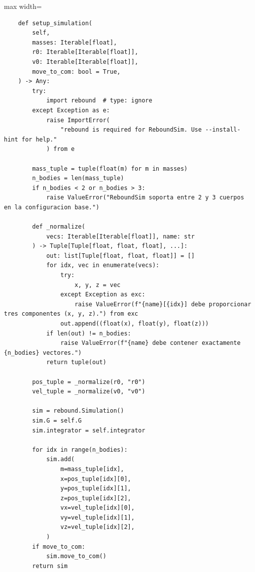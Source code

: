\begin{listing}[H]
\caption{Bloque de código de \texttt{setup\_simulation}}
\begin{minipage}{\linewidth}
{
\begin{adjustbox}{max width=\textwidth}
\begin{minipage}{\textwidth}
\begin{verbatim}
    def setup_simulation(
        self,
        masses: Iterable[float],
        r0: Iterable[Iterable[float]],
        v0: Iterable[Iterable[float]],
        move_to_com: bool = True,
    ) -> Any:
        try:
            import rebound  # type: ignore
        except Exception as e:
            raise ImportError(
                "rebound is required for ReboundSim. Use --install-hint for help."
            ) from e

        mass_tuple = tuple(float(m) for m in masses)
        n_bodies = len(mass_tuple)
        if n_bodies < 2 or n_bodies > 3:
            raise ValueError("ReboundSim soporta entre 2 y 3 cuerpos en la configuracion base.")

        def _normalize(
            vecs: Iterable[Iterable[float]], name: str
        ) -> Tuple[Tuple[float, float, float], ...]:
            out: list[Tuple[float, float, float]] = []
            for idx, vec in enumerate(vecs):
                try:
                    x, y, z = vec
                except Exception as exc:
                    raise ValueError(f"{name}[{idx}] debe proporcionar tres componentes (x, y, z).") from exc
                out.append((float(x), float(y), float(z)))
            if len(out) != n_bodies:
                raise ValueError(f"{name} debe contener exactamente {n_bodies} vectores.")
            return tuple(out)

        pos_tuple = _normalize(r0, "r0")
        vel_tuple = _normalize(v0, "v0")

        sim = rebound.Simulation()
        sim.G = self.G
        sim.integrator = self.integrator

        for idx in range(n_bodies):
            sim.add(
                m=mass_tuple[idx],
                x=pos_tuple[idx][0],
                y=pos_tuple[idx][1],
                z=pos_tuple[idx][2],
                vx=vel_tuple[idx][0],
                vy=vel_tuple[idx][1],
                vz=vel_tuple[idx][2],
            )
        if move_to_com:
            sim.move_to_com()
        return sim
\end{verbatim}
\end{minipage}
\end{adjustbox}
}
\end{minipage}
\end{listing}
\vspace{0.2cm}


